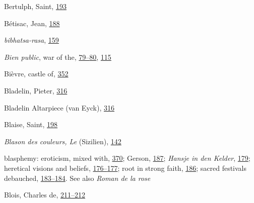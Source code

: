 Bertulph, Saint,
\protect\hyperlink{13_Chapter_Six__THE_DEPICTION_OF_TH.xhtmlux5cux23page_193}{193}

Bétisac, Jean,
\protect\hyperlink{13_Chapter_Six__THE_DEPICTION_OF_TH.xhtmlux5cux23page_188}{188}

\emph{bibhatsa-rasa},
\protect\hyperlink{12_Chapter_Five__THE_VISION_OF_DEAT.xhtmlux5cux23page_159}{159}

\emph{Bien public}, war of the,
\protect\hyperlink{10_Chapter_Three__THE_HEROIC_DREAM.xhtmlux5cux23page_79}{79--}\protect\hyperlink{10_Chapter_Three__THE_HEROIC_DREAM.xhtmlux5cux23page_80}{80},
\protect\hyperlink{10_Chapter_Three__THE_HEROIC_DREAM.xhtmlux5cux23page_115}{115}

Bièvre, castle of,
\protect\hyperlink{21_Chapter_Thirteen__IMAGE_AND_WORD.xhtmlux5cux23page_352}{352}

Bladelin, Pieter,
\protect\hyperlink{20_ILLUSTRATIONS_FOLLOW_PAGE.xhtmlux5cux23page_316}{316}

Bladelin Altarpiece (van Eyck),
\protect\hyperlink{20_ILLUSTRATIONS_FOLLOW_PAGE.xhtmlux5cux23page_316}{316}

Blaise, Saint,
\protect\hyperlink{13_Chapter_Six__THE_DEPICTION_OF_TH.xhtmlux5cux23page_198}{198}

\emph{Blason des couleurs, Le} (Sizilien),
\protect\hyperlink{11_Chapter_Four__THE_FORMS_OF_LOVE.xhtmlux5cux23page_142}{142}

blasphemy: eroticism, mixed with,
\protect\hyperlink{21_Chapter_Thirteen__IMAGE_AND_WORD.xhtmlux5cux23page_370}{370};
Gerson,
\protect\hyperlink{13_Chapter_Six__THE_DEPICTION_OF_TH.xhtmlux5cux23page_187}{187};
\emph{Hansje in den Kelder},
\protect\hyperlink{13_Chapter_Six__THE_DEPICTION_OF_TH.xhtmlux5cux23page_179}{179};
heretical visions and beliefs,
\protect\hyperlink{13_Chapter_Six__THE_DEPICTION_OF_TH.xhtmlux5cux23page_176}{176--}\protect\hyperlink{13_Chapter_Six__THE_DEPICTION_OF_TH.xhtmlux5cux23page_177}{177};
root in strong faith,
\protect\hyperlink{13_Chapter_Six__THE_DEPICTION_OF_TH.xhtmlux5cux23page_186}{186};
sacred festivals debauched,
\protect\hyperlink{13_Chapter_Six__THE_DEPICTION_OF_TH.xhtmlux5cux23page_183}{183--}\protect\hyperlink{13_Chapter_Six__THE_DEPICTION_OF_TH.xhtmlux5cux23page_184}{184}.
See also \emph{Roman de la rose}

Blois, Charles de,
\protect\hyperlink{14_Chapter_Seven__THE_PIOUS_PERSONA.xhtmlux5cux23page_211}{211--}\protect\hyperlink{14_Chapter_Seven__THE_PIOUS_PERSONA.xhtmlux5cux23page_212}{212}

